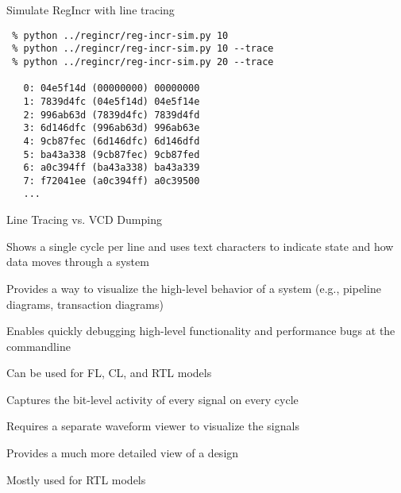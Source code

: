 \begin{task}\begin{frame}[fragile]{Simulate RegIncr with line tracing}

\vspace{-0.15in}
\begin{Verbatim}[commandchars=\\\{\}]
 % cd \midtilde/pymtl-tut/build
 % python ../regincr/reg-incr-sim.py 10
 % python ../regincr/reg-incr-sim.py 10 --trace
 % python ../regincr/reg-incr-sim.py 20 --trace

   0: 04e5f14d (00000000) 00000000
   1: 7839d4fc (04e5f14d) 04e5f14e
   2: 996ab63d (7839d4fc) 7839d4fd
   3: 6d146dfc (996ab63d) 996ab63e
   4: 9cb87fec (6d146dfc) 6d146dfd
   5: ba43a338 (9cb87fec) 9cb87fed
   6: a0c394ff (ba43a338) ba43a339
   7: f72041ee (a0c394ff) a0c39500
   ...
\end{Verbatim}

\end{frame}
\end{task}

\begin{frame}{Line Tracing vs. VCD Dumping}

\begin{cbxlist}

  \1 

    \2 Shows a single cycle per line and uses text characters to indicate
       state and how data moves through a system

    \vspace{0.08in}
    \2 Provides a way to visualize the high-level behavior of a system
       (e.g., pipeline diagrams, transaction diagrams)

    \vspace{0.08in}
    \2 Enables quickly debugging high-level functionality and performance
       bugs at the commandline

    \vspace{0.08in}
    \2 Can be used for FL, CL, and RTL models

  \1 

    \2 Captures the bit-level activity of every signal on every cycle

    \2 Requires a separate waveform viewer to visualize the signals

    \2 Provides a much more detailed view of a design

    \2 Mostly used for RTL models

\end{cbxlist}
\end{frame}

